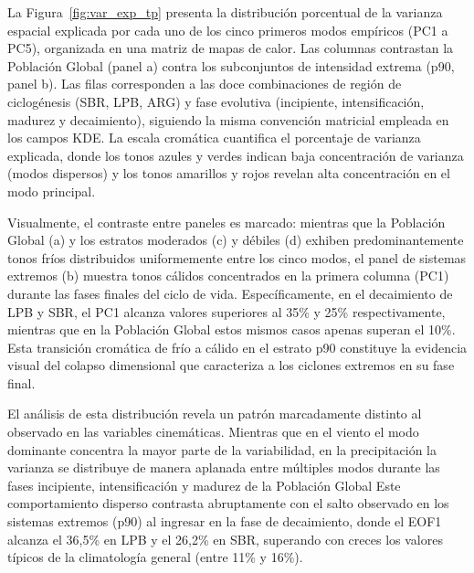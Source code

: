 La Figura~\ref{fig:var_exp_tp} presenta la distribución porcentual de la varianza espacial explicada por cada uno de los cinco primeros modos empíricos (PC1 a PC5), organizada en una matriz de mapas de calor. Las columnas contrastan la Población Global (panel a) contra los subconjuntos de intensidad extrema (p90, panel b). Las filas corresponden a las doce combinaciones de región de ciclogénesis (SBR, LPB, ARG) y fase evolutiva (incipiente, intensificación, madurez y decaimiento), siguiendo la misma convención matricial empleada en los campos KDE. La escala cromática cuantifica el porcentaje de varianza explicada, donde los tonos azules y verdes indican baja concentración de varianza (modos dispersos) y los tonos amarillos y rojos revelan alta concentración en el modo principal.

Visualmente, el contraste entre paneles es marcado: mientras que la Población Global (a) y los estratos moderados (c) y débiles (d) exhiben predominantemente tonos fríos distribuidos uniformemente entre los cinco modos, el panel de sistemas extremos (b) muestra tonos cálidos concentrados en la primera columna (PC1) durante las fases finales del ciclo de vida. Específicamente, en el decaimiento de LPB y SBR, el PC1 alcanza valores superiores al 35\% y 25\% respectivamente, mientras que en la Población Global estos mismos casos apenas superan el 10\%. Esta transición cromática de frío a cálido en el estrato p90 constituye la evidencia visual del colapso dimensional que caracteriza a los ciclones extremos en su fase final.

El análisis de esta distribución revela un patrón marcadamente distinto al observado en las variables cinemáticas. Mientras que en el viento el modo dominante concentra la mayor parte de la variabilidad, en la precipitación la varianza se distribuye de manera aplanada entre múltiples modos durante las fases incipiente, intensificación y madurez de la Población Global %
Este comportamiento disperso contrasta abruptamente con el salto observado en los sistemas extremos (p90) al ingresar en la fase de decaimiento, donde el EOF1 alcanza el 36,5\% en LPB y el 26,2\% en SBR, superando con creces los valores típicos de la climatología general (entre 11\% y 16\%).

